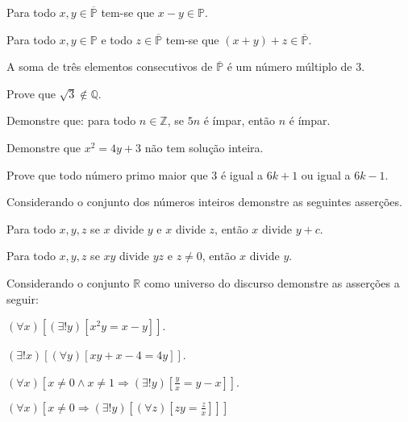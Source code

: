 \begin{exerList}
	\item Para todo $x, y \in \overline{\mathbb{P}}$ tem-se que $x - y \in \mathbb{P}$.
	\item Para todo $x, y\in \mathbb{P}$ e todo $z \in \overline{\mathbb{P}}$ tem-se que $(x + y) + z \in \overline{\mathbb{P}}$.
	\item A soma de três elementos consecutivos de $\overline{\mathbb{P}}$ é um número múltiplo de $3$.
\end{exerList}

\begin{problem}\label{prob:Demosntracoes9}
	Prove que $\sqrt{3} \notin \mathbb{Q}$.
\end{problem}

\begin{problem}\label{prob:Demosntracoes10}
	Demonstre que: para todo $n \in \mathbb{Z}$, se $5n$ é ímpar, então $n$ é ímpar.
\end{problem}

\begin{problem}\label{prob:Demosntracoes11}
	Demonstre que $x^2 = 4y + 3$ não tem solução inteira.
\end{problem}

\begin{problem}\label{prob:Demosntracoes12}
	Prove que todo número primo maior que $3$ é igual a $6k+1$ ou igual a $6k-1$.
\end{problem}

\begin{problem}\label{prob:Demosntracoes13}
	Considerando o conjunto dos números inteiros demonstre as seguintes asserções.
\end{problem}

\begin{exerList}
	\item Para todo $x, y, z$ se $x$ divide $y$ e $x$ divide $z$, então $x$ divide $y + c$.
	\item Para todo $x, y, z$ se $xy$ divide $yz$ e $z \neq 0$, então $x$ divide $y$.
\end{exerList}

\begin{problem}\label{prob:Demosntracoes14}
	Considerando o conjunto $ \mathbb{R}$ como universo do discurso demonstre as asserções a seguir:
\end{problem}

\begin{exerList}
	\item $(\forall x)[(\exists ! y)[x^2y = x - y]]$.
	\item $(\exists ! x)[(\forall y)[xy + x - 4 = 4y]]$.
	\item $(\forall x)[x \neq 0 \land x \neq 1 \Rightarrow (\exists! y)[\frac{y}{x} = y-x]]$.
	\item $(\forall x)[x \neq 0 \Rightarrow (\exists ! y)[(\forall z)[zy = \frac{z}{x}]]]$
\end{exerList}

